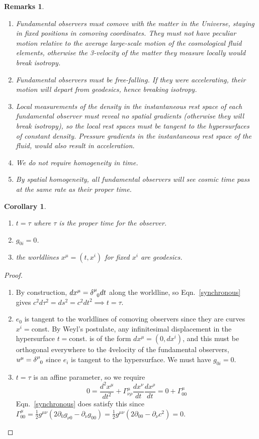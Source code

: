 \documentclass[a4paper]{article}
\newtheorem{remarks}{Remarks}[section]
\theoremstyle{new}
\newtheorem{cor}{Corollary}[section]
\begin{document}
\begin{remarks}\leavevmode
\begin{enumerate}
    \item Fundamental observers must comove with the matter in the Universe, staying in fixed positions in comoving coordinates. They must not have peculiar motion relative to the average large-scale motion of the cosmological fluid elements, otherwise the 3-velocity of the matter they measure locally would break isotropy.
    \item Fundamental observers must be free-falling. If they were accelerating, their motion will depart from geodesics, hence breaking isotropy.
    \item Local measurements of the density in the instantaneous rest space of each fundamental observer must reveal no spatial gradients (otherwise they will break isotropy), so the local rest spaces must be tangent to the hypersurfaces of constant density. Pressure gradients in the instantaneous rest space of the fluid, would also result in acceleration.
    \item We do not require homogeneity in time.
    \item By spatial homogeneity, all fundamental observers will see cosmic time pass at the same rate as their proper time.
\end{enumerate}
\end{remarks}
\newpage
\begin{cor}\leavevmode
\begin{enumerate}
    \item $t=\tau$ where $\tau$ is the proper time for the observer.
    \item $g_{0i}=0$.
    \item the worldlines $x^\mu=(t,x^i)$ for fixed $x^i$ are geodesics.
\end{enumerate}
\end{cor}
\begin{proof}\leavevmode
\begin{enumerate}
    \item By construction, $dx^\mu=\tensor*{\delta}{*_{}^{\mu}_{0}}dt$ along the worldline, so Eqn.~\ref{synchronous} gives $c^2d\tau^2=ds^2=c^2dt^2\implies t=\tau$.
    \item $e_0$ is tangent to the worldlines of comoving observers since they are curves $x^i=$const. By Weyl's postulate, any infinitesimal displacement in the hypersurface $t=$const. is of the form $dx^\mu=(0,dx^i)$, and this must be orthogonal everywhere to the 4velocity of the fundamental observers, $u^\mu=\tensor*{\delta}{*_{}^{\mu}_{0}}$ since $e_i$ is tangent to the hypersurface. We must have $g_{0i}=0$.
    \item $t=\tau$ is an affine parameter, so we require
    $$0=\frac{d^2x^\mu}{dt^2}+\Gamma^\mu_{\nu\rho}\frac{dx^\nu}{dt}\frac{dx^\rho}{dt}=0+\Gamma_{00}^\mu$$
    Eqn.~\ref{synchronous} does satisfy this since $\Gamma_{00}^\mu=\frac{1}{2}g^{\mu\nu}(2\partial_0g_{\nu0}-\partial_\nu g_{00})=\frac{1}{2}g^{\mu\nu}(2\partial_00-\partial_\nu c^2)=0$.
\end{enumerate}
\end{proof}
\end{document}
